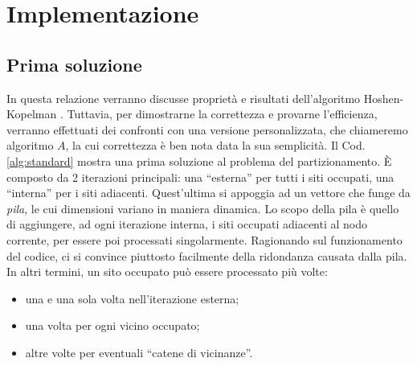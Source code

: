 \section{Implementazione}
\label{sec:implementazione}

\subsection*{Prima soluzione}

In questa relazione verranno discusse proprietà e risultati 
dell'algoritmo Hoshen-Kopelman \cite{Hoshen-Kopelman}.
Tuttavia, per dimostrarne la correttezza e provarne l'efficienza,
verranno effettuati dei confronti con una versione personalizzata,
che chiameremo algoritmo $A$,
la cui correttezza è ben nota data la sua semplicità.
Il Cod. \ref{alg:standard} mostra una prima soluzione 
al problema del partizionamento. È composto da 2 iterazioni principali: 
una ``esterna'' per tutti i siti occupati, una ``interna'' per i siti 
adiacenti. Quest'ultima si appoggia ad un vettore che 
funge da \textit{pila}, le cui dimensioni variano in maniera dinamica.
Lo scopo della pila è quello di aggiungere, ad ogni iterazione interna, 
i siti occupati adiacenti al nodo corrente, per essere poi processati
singolarmente.
Ragionando sul funzionamento del codice, ci si convince piuttosto 
facilmente della ridondanza causata dalla pila. In altri termini,
un sito occupato può essere processato più volte:
\begin{itemize}
    \item una e una sola volta nell'iterazione esterna;
    \item una volta per ogni vicino occupato;
    \item altre volte per eventuali ``catene di vicinanze''.
\end{itemize}




